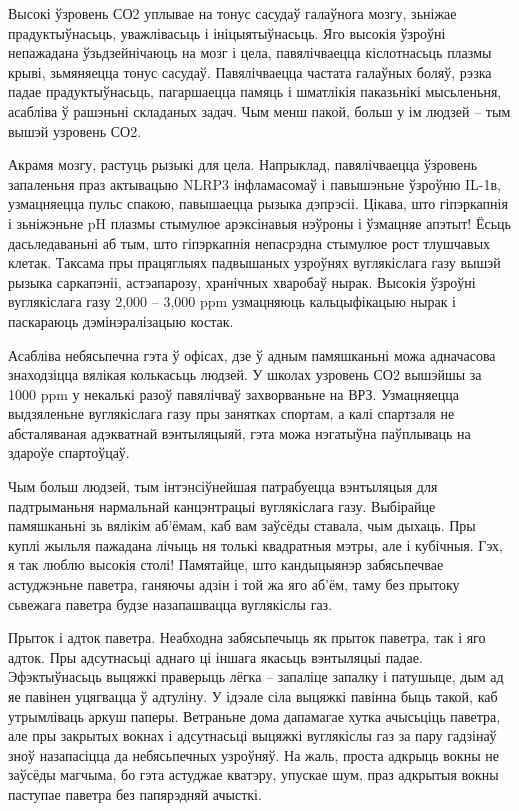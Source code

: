 Высокі ўзровень СО2 уплывае на тонус сасудаў галаўнога мозгу, зьніжае прадуктыўнасьць, уважлівасьць і ініцыятыўнасьць. Яго высокія ўзроўні непажадана ўзьдзейнічаюць на мозг і цела, павялічваецца кіслотнасьць плазмы крыві, зьмяняецца тонус сасудаў. Павялічваецца частата галаўных боляў, рэзка падае прадуктыўнасьць, пагаршаецца памяць і шматлікія паказьнікі мысьленьня, асабліва ў рашэньні складаных задач. Чым менш пакой, больш у ім людзей – тым вышэй узровень СО2.

Акрамя мозгу, растуць рызыкі для цела. Напрыклад, павялічваецца ўзровень запаленьня праз актывацыю NLRP3 інфламасомаў і павышэньне ўзроўню IL-1в, узмацняецца пульс спакою, павышаецца рызыка дэпрэсіі. Цікава, што гіпэркапнія і зьніжэньне pH плазмы стымулюе арэксінавыя нэўроны і ўзмацняе апэтыт! Ёсьць дасьледаваньні аб тым, што гіпэркапнія непасрэдна стымулюе рост тлушчавых клетак. Таксама пры працяглыях падвышаных узроўнях вуглякіслага газу вышэй рызыка саркапэніі, астэапарозу, хранічных хваробаў нырак. Высокія ўзроўні вуглякіслага газу 2,000 – 3,000 ppm узмацняюць кальцыфікацыю нырак і паскараюць дэмінэралізацыю костак.

Асабліва небясьпечна гэта ў офісах, дзе ў адным памяшканьні можа адначасова знаходзіцца вялікая колькасьць людзей. У школах узровень СО2 вышэйшы за 1000 ppm у некалькі разоў павялічваў захворваньне на ВРЗ. Узмацняецца выдзяленьне вуглякіслага газу пры занятках спортам, а калі спартзаля не абсталяваная адэкватнай вэнтыляцыяй, гэта можа нэгатыўна паўплываць на здароўе спартоўцаў.

Чым больш людзей, тым інтэнсіўнейшая патрабуецца вэнтыляцыя для падтрыманьня нармальнай канцэнтрацыі вуглякіслага газу. Выбірайце памяшканьні зь вялікім аб'ёмам, каб вам заўсёды ставала, чым дыхаць. Пры куплі жыльля пажадана лічыць ня толькі квадратныя мэтры, але і кубічныя. Гэх, я так люблю высокія столі! Памятайце, што кандыцыянэр забясьпечвае астуджэньне паветра, ганяючы адзін і той жа яго аб'ём, таму без прытоку сьвежага паветра будзе назапашвацца вуглякіслы газ.

Прыток і адток паветра. Неабходна забясьпечыць як прыток паветра, так і яго адток. Пры адсутнасьці аднаго ці іншага якасьць вэнтыляцыі падае. Эфэктыўнасьць выцяжкі праверыць лёгка – запаліце запалку і патушыце, дым ад яе павінен уцягвацца ў адтуліну. У ідэале сіла выцяжкі павінна быць такой, каб утрымліваць аркуш паперы. Ветраньне дома дапамагае хутка ачысьціць паветра, але пры закрытых вокнах і адсутнасьці выцяжкі вуглякіслы газ за пару гадзінаў зноў назапасіцца да небясьпечных узроўняў. На жаль, проста адкрыць вокны не заўсёды магчыма, бо гэта астуджае кватэру, упускае шум, праз адкрытыя вокны паступае паветра без папярэдняй ачысткі.

